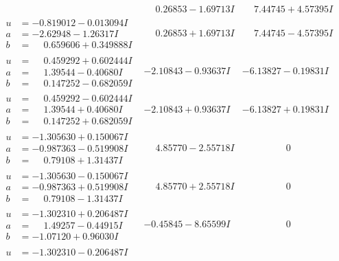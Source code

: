 \documentclass[1p]{elsarticle_modified}
\theoremstyle{definition}
\begin{document}
$$\begin{array}{c|c|c}
 & \phantom{-}0.26853 - 1.69713 I & \phantom{-}7.44745 + 4.57395 I \\ \hline\begin{aligned}
u &= -0.819012 - 0.013094 I \\
a &= -2.62948 - 1.26317 I \\
b &= \phantom{-}0.659606 + 0.349888 I\end{aligned}
 & \phantom{-}0.26853 + 1.69713 I & \phantom{-}7.44745 - 4.57395 I \\ \hline\begin{aligned}
u &= \phantom{-}0.459292 + 0.602444 I \\
a &= \phantom{-}1.39544 - 0.40680 I \\
b &= \phantom{-}0.147252 - 0.682059 I\end{aligned}
 & -2.10843 - 0.93637 I & -6.13827 - 0.19831 I \\ \hline\begin{aligned}
u &= \phantom{-}0.459292 - 0.602444 I \\
a &= \phantom{-}1.39544 + 0.40680 I \\
b &= \phantom{-}0.147252 + 0.682059 I\end{aligned}
 & -2.10843 + 0.93637 I & -6.13827 + 0.19831 I \\ \hline\begin{aligned}
u &= -1.305630 + 0.150067 I \\
a &= -0.987363 - 0.519908 I \\
b &= \phantom{-}0.79108 + 1.31437 I\end{aligned}
 & \phantom{-}4.85770 - 2.55718 I & \phantom{-0.000000 } 0 \\ \hline\begin{aligned}
u &= -1.305630 - 0.150067 I \\
a &= -0.987363 + 0.519908 I \\
b &= \phantom{-}0.79108 - 1.31437 I\end{aligned}
 & \phantom{-}4.85770 + 2.55718 I & \phantom{-0.000000 } 0 \\ \hline\begin{aligned}
u &= -1.302310 + 0.206487 I \\
a &= \phantom{-}1.49257 - 0.44915 I \\
b &= -1.07120 + 0.96030 I\end{aligned}
 & -0.45845 - 8.65599 I & \phantom{-0.000000 } 0 \\ \hline\begin{aligned}
u &= -1.302310 - 0.206487 I \\

\end{aligned}
\end{array}$$
\end{document}
